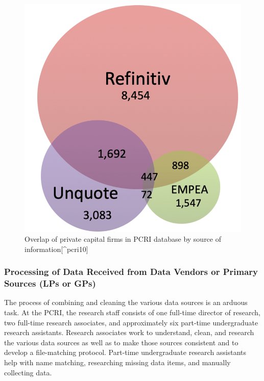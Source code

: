 \documentclass[
]{WileySix}
\begin{document}
\begin{figure}
\includegraphics[width=1\linewidth]{./assets/pcri/pcrifigure1web} \caption{Overlap of private capital firms in PCRI database by source of information[^pcri10]}\label{fig:pcrifigure1}
\end{figure}

\hypertarget{processing-of-data-received-from-data-vendors-or-primary-sources-lps-or-gps}{%
\subsubsection{Processing of Data Received from Data Vendors or Primary Sources (LPs or GPs)}\label{processing-of-data-received-from-data-vendors-or-primary-sources-lps-or-gps}}

The process of combining and cleaning the various data sources is an arduous task. At the PCRI, the research staff consists of one full-time director of research, two full-time research associates, and approximately six part-time undergraduate research assistants. Research associates work to understand, clean, and research the various data sources as well as to make those sources consistent and to develop a file-matching protocol. Part-time undergraduate research assistants help with name matching, researching missing data items, and manually collecting data.
\end{document}
